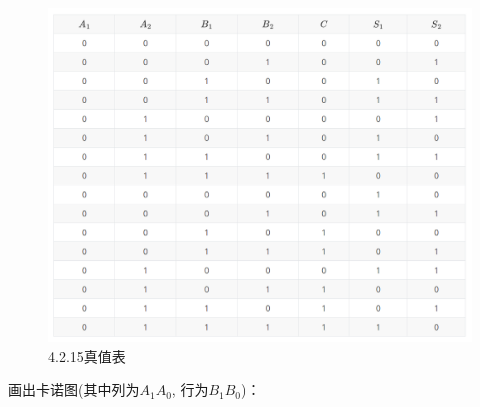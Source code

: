 \documentclass[a4paper,11pt,UTF8]{article}
\begin{document}
\begin{figure}[H]
	\centering
	\includegraphics[scale=0.30]{SD4.2.15_1}
	\caption{4.2.15真值表}
\end{figure}
画出卡诺图(其中列为$A_1A_0$, 行为$B_1B_0$)：
\end{document}
